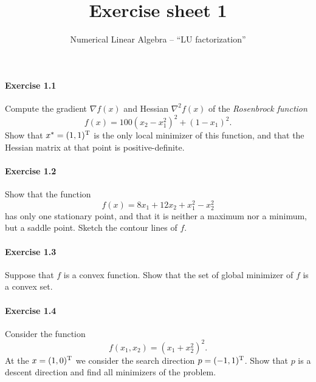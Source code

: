 
\subtitle{Numerical Linear Algebra -- ``LU factorization''}
\title{Exercise sheet 1}
\date{}
\usepackage{amsmath}
\newcommand\tp{\ensuremath{\text{\upshape T}}}

\maketitle
\vspace{-15ex}
\paragraph{Exercise 1.1}
Compute  the gradient $\nabla f(x)$ and Hessian $\nabla^2f(x)$ of the
\emph{Rosenbrock function}
\begin{equation}\label{eq:rosenbrock}
  f(x) = 100(x_2-x_1^2)^2 + (1-x_1)^2.
\end{equation}
Show that $x^*=(1,1)^\tp$ is the only local minimizer of this function, and
that the Hessian matrix at that point is positive-definite.

\paragraph{Exercise 1.2}
Show that the function
\[
  f(x) = 8x_1 + 12x_2 + x_1^2 - x_2^2
\]
has only one stationary point, and that it is neither a maximum nor a minimum,
but a saddle point. Sketch the contour lines of $f$.

\paragraph{Exercise 1.3}
Suppose that $f$ is a convex function. Show that the set of global minimizer
of $f$ is a convex set.

\paragraph{Exercise 1.4}
Consider the function
\[
  f(x_1, x_2) = (x_1+x_2^2)^2.
\]
At the $x=(1,0)^\tp$ we consider the search direction $p=(-1,1)^\tp$. Show
that $p$ is a descent direction and find all minimizers of the problem.

